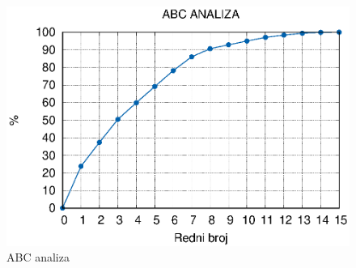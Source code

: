 \documentclass[a4paper,12pt]{article}
\numberwithin{figure}{section}
\begin{document}
\begin{figure}
  \centering
    \includegraphics[width=0.8\paperwidth]{abcAnaliza.eps}
    \caption{ABC analiza}
    \label{analiza}
\end{figure}
\FloatBarrier
\end{document}
